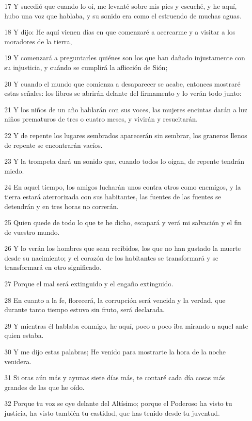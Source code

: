 \par 17 Y sucedió que cuando lo oí, me levanté sobre mis pies y escuché, y he aquí, hubo una voz que hablaba, y su sonido era como el estruendo de muchas aguas.
\par 18 Y dijo: He aquí vienen días en que comenzaré a acercarme y a visitar a los moradores de la tierra,
\par 19 Y comenzará a preguntarles quiénes son los que han dañado injustamente con su injusticia, y cuándo se cumplirá la aflicción de Sión;
\par 20 Y cuando el mundo que comienza a desaparecer se acabe, entonces mostraré estas señales: los libros se abrirán delante del firmamento y lo verán todo junto:
\par 21 Y los niños de un año hablarán con sus voces, las mujeres encintas darán a luz niños prematuros de tres o cuatro meses, y vivirán y resucitarán.
\par 22 Y de repente los lugares sembrados aparecerán sin sembrar, los graneros llenos de repente se encontrarán vacíos.
\par 23 Y la trompeta dará un sonido que, cuando todos lo oigan, de repente tendrán miedo.
\par 24 En aquel tiempo, los amigos lucharán unos contra otros como enemigos, y la tierra estará aterrorizada con sus habitantes, las fuentes de las fuentes se detendrán y en tres horas no correrán.
\par 25 Quien quede de todo lo que te he dicho, escapará y verá mi salvación y el fin de vuestro mundo.
\par 26 Y lo verán los hombres que sean recibidos, los que no han gustado la muerte desde su nacimiento; y el corazón de los habitantes se transformará y se transformará en otro significado.
\par 27 Porque el mal será extinguido y el engaño extinguido.
\par 28 En cuanto a la fe, florecerá, la corrupción será vencida y la verdad, que durante tanto tiempo estuvo sin fruto, será declarada.
\par 29 Y mientras él hablaba conmigo, he aquí, poco a poco iba mirando a aquel ante quien estaba.
\par 30 Y me dijo estas palabras; He venido para mostrarte la hora de la noche venidera.
\par 31 Si oras aún más y ayunas siete días más, te contaré cada día cosas más grandes de las que he oído.
\par 32 Porque tu voz se oye delante del Altísimo; porque el Poderoso ha visto tu justicia, ha visto también tu castidad, que has tenido desde tu juventud.
